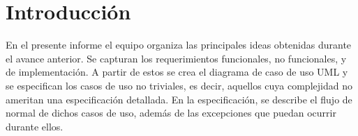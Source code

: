 \section{Introducción}

En el presente informe el equipo organiza las principales ideas obtenidas durante el avance anterior. Se capturan los requerimientos funcionales, no funcionales, y de implementación. A partir de estos se crea el diagrama de caso de uso UML y se especifican los casos de uso no triviales, es decir, aquellos cuya complejidad no ameritan una especificación detallada. En la especificación, se describe el flujo de normal de dichos casos de uso, además de las excepciones que puedan ocurrir durante ellos.
